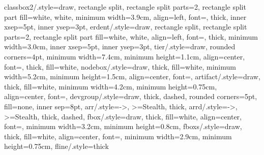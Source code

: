 {  classbox2/.style={draw, rectangle split, rectangle split parts=2,
    rectangle split part fill={white, white},
    minimum width=3.9cm, align=left, font=\scriptsize, thick,
    inner xsep=5pt, inner ysep=3pt},
  erdent/.style={draw, rectangle split, rectangle split parts=2,
    rectangle split part fill={white, white},
    align=left, font=\scriptsize, thick, minimum width=3.0cm,
    inner xsep=5pt, inner ysep=3pt},
  tier/.style={draw, rounded corners=4pt, minimum width=7.4cm,
    minimum height=1.1cm, align=center, font=\small, thick, fill=white},
  nodebox/.style={draw, thick, fill=white, minimum width=5.2cm,
    minimum height=1.5cm, align=center, font=\small},
  artifact/.style={draw, thick, fill=white, minimum width=4.2cm,
    minimum height=0.75cm, align=center, font=\scriptsize},
  devgroup/.style={draw, thick, dashed, rounded corners=5pt, fill=none,
    inner sep=8pt},
  arr/.style={->, >=Stealth, thick},
  arrd/.style={->, >=Stealth, thick, dashed},
  fbox/.style={draw, thick, fill=white, align=center, font=\small,
    minimum width=3.2cm, minimum height=0.8cm},
  fboxs/.style={draw, thick, fill=white, align=center, font=\scriptsize,
    minimum width=2.9cm, minimum height=0.75cm},
  fline/.style={thick}
}


\newcommand{\stickman}[4]{%
  \coordinate (#1) at (#2,#3);
  \begin{scope}[shift={(#2,#3)}]
    \draw[very thick] (0,0.55) circle (0.17);
    \draw[very thick] (0,0.38) -- (0,-0.12);
    \draw[very thick] (-0.30,0.18) -- (0.30,0.18);
    \draw[very thick] (0,-0.12) -- (-0.20,-0.50);
    \draw[very thick] (0,-0.12) -- (0.20,-0.50);
  \end{scope}
  \node[font=\small, align=center, text width=2.6cm] at (#2,#3-0.92) {#4};
}
